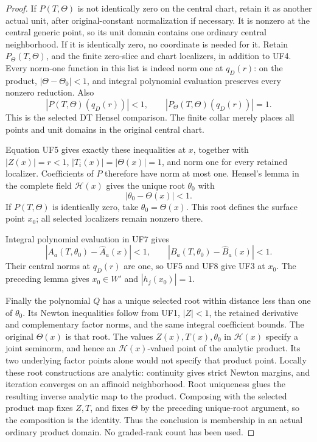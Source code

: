 \begin{proof}
If \(P(T,\Theta)\) is not identically zero on the
central chart, retain it as another actual unit,
after original-constant normalization if necessary.
It is nonzero at the central generic point, so
its unit domain contains one ordinary central
neighborhood.  If it is identically zero, no
coordinate is needed for it.  Retain
\(P_\Theta(T,\Theta)\), and the finite zero-slice
and chart localizers, in addition to UF4.  Every
norm-one function in this list is indeed norm
one at \(q_D(r)\): on the product,
\(|\Theta-\Theta_0|<1\), and integral polynomial
evaluation preserves every nonzero reduction.
Also
\[
 |P(T,\Theta)(q_D(r))|<1,
 \qquad |P_\Theta(T,\Theta)(q_D(r))|=1.
\tag{UF6}
\]
This is the selected DT Hensel comparison.  The
finite collar merely places all points and unit
domains in the original central chart.

Equation UF5 gives exactly these inequalities
at \(x\), together with \(|Z(x)|=r<1\),
\(|T_i(x)|=|\Theta(x)|=1\), and norm one for
every retained localizer.  Coefficients of \(P\)
therefore have norm at most one.  Hensel's lemma
in the complete field \(\mathcal H(x)\) gives
the unique root \(\theta_0\) with
\[
                       |\theta_0-\Theta(x)|<1.
\tag{UF7}
\]
If \(P(T,\Theta)\) is identically zero, take
\(\theta_0=\Theta(x)\).  This root defines
the surface point \(x_0\); all selected
localizers remain nonzero there.

Integral polynomial evaluation in UF7 gives
\[
 |A_a(T,\theta_0)-\widehat A_a(x)|<1,
 \qquad
 |B_a(T,\theta_0)-\widehat B_a(x)|<1.
\tag{UF8}
\]
Their central norms at \(q_D(r)\) are one,
so UF5 and UF8 give UF3 at \(x_0\).  The
preceding lemma gives \(x_0\in W'\) and
\(|h_j(x_0)|=1\).

Finally the polynomial \(Q\) has a unique
selected root within distance less than one
of \(\theta_0\).  Its Newton inequalities
follow from UF1, \(|Z|<1\), the retained
derivative and complementary factor norms,
and the same integral coefficient bounds.
The original \(\Theta(x)\) is that root.
The values \(Z(x),T(x),\theta_0\) in
\(\mathcal H(x)\) specify a joint seminorm,
and hence an \(\mathcal H(x)\)-valued
point of the analytic product.  Its two
underlying factor points alone would not
specify that product point.  Locally these
root constructions are analytic: continuity
gives strict Newton margins, and iteration
converges on an affinoid neighborhood.  Root
uniqueness glues the resulting inverse
analytic map to the product.  Composing
with the selected product map fixes
\(Z,T\), and fixes \(\Theta\) by the
preceding unique-root argument, so the
composition is the identity.  Thus
the conclusion is membership in an actual
ordinary product domain.  No graded-rank
count has been used.
\end{proof}

